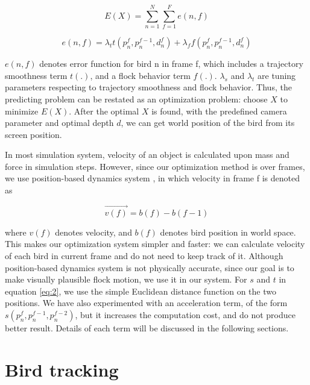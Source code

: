 \begin{equation}\label{eq:1}
 E(X) = \sum_{n = 1}^{N} \sum_{f = 1}^{F}e(n,f)
\end{equation}


\begin{equation}\label{eq:2}
 e(n,f) = \lambda_tt(p_n^f, p_n^{f-1},d_n^f) + \lambda_ff(p_n^f, p_n^{f-1},d_n^f)
\end{equation}


$e(n,f)$ denotes error function for bird n in frame f, which includes a trajectory smoothness term $t(.)$, and a flock behavior term $f(.)$. $\lambda_s$ and $\lambda_t$ are tuning parameters respecting to trajectory smoothness and flock behavior. Thus, the predicting problem can be restated as an optimization problem: choose $X$ to minimize $E(X)$. After the optimal $X$ is found, with the predefined camera parameter and optimal depth $d$, we can get world position of the bird from its screen position.


In most simulation system, velocity of an object is calculated upon mass and force in simulation steps. However, since our optimization method is over frames, we use position-based dynamics system \cite{PBD}, in which velocity in frame f is denoted as

\begin{equation}\label{eq:3}
 \vec{v(f)} = b(f)-b(f-1)
\end{equation}

where $v(f)$ denotes velocity, and $b(f)$ denotes bird position in world space. This makes our optimization system simpler and faster: we can calculate velocity of each bird in current frame and do not need to keep track of it. Although position-based dynamics system is not physically accurate, since our goal is to make visually plausible flock motion, we use it in our system.
For $s$ and $t$ in equation \ref{eq:2}, we use the simple Euclidean distance function on the two positions. We have also experimented with an acceleration term, of the form $s(p_n^f, p_n^{f-1}, p_n^{f-2})$, but it increases the computation cost, and do not produce better result. Details of each term will be discussed in the following sections.


\section{Bird tracking}


